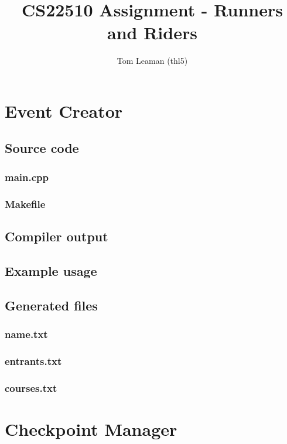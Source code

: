 \documentclass[a4paper, twoside]{article}
\title{CS22510 Assignment - Runners and Riders}
\author{Tom Leaman (thl5)}
\begin{document}
\maketitle
\newpage
\tableofcontents
\newpage

\section{Event Creator}
\subsection{Source code}
\subsubsection{main.cpp}

\subsubsection{Makefile}

\subsection{Compiler output}

\subsection{Example usage}

\subsection{Generated files}
\subsubsection{name.txt}

\subsubsection{entrants.txt}

\subsubsection{courses.txt}


\newpage

\section{Checkpoint Manager}
\end{document}
